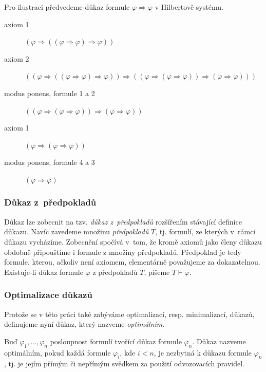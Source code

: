 \documentclass[thesis=B,czech,hidelinks]{thesis}[2012/06/26]
\begin{document}
\begin{exm}
\label{exm:proof_a>a}
Pro ilustraci předvedeme důkaz formule $\varphi \Rightarrow \varphi$ v Hilbertově systému.
\begin{description}
	\item[axiom 1] $(\varphi \Rightarrow ((\varphi \Rightarrow \varphi) \Rightarrow \varphi))$
	\item[axiom 2] $((\varphi \Rightarrow ((\varphi \Rightarrow \varphi) \Rightarrow \varphi)) \Rightarrow ((\varphi \Rightarrow (\varphi \Rightarrow \varphi)) \Rightarrow (\varphi \Rightarrow \varphi)))$
	\item[modus ponens, formule 1 a 2] $((\varphi \Rightarrow (\varphi \Rightarrow \varphi)) \Rightarrow (\varphi \Rightarrow \varphi))$
	\item[axiom 1] $(\varphi \Rightarrow (\varphi \Rightarrow \varphi))$
	\item[modus ponens, formule 4 a 3] $(\varphi \Rightarrow \varphi)$
\end{description}
\end{exm}

\subsubsection{Důkaz z~předpokladů}
\label{sec:proof_theory}

Důkaz lze zobecnit na tzv. \emph{důkaz z~předpokladů} rozšířením stávající definice důkazu. Navíc zavedeme množinu \emph{předpokladů} $T$, tj. formulí, ze kterých v~rámci důkazu vycházíme. Zobecnění spočívá v~tom, že kromě axiomů jako členy důkazu obdobně připouštíme i formule z množiny předpokladů. Předpoklad je tedy formule, kterou, ačkoliv není axiomem, elementárně považujeme za dokazatelnou. Existuje-li důkaz formule $\varphi$ z předpokladů $T$, píšeme $T \vdash \varphi$.

\subsubsection{Optimalizace důkazů}

Protože se v této práci také zabýváme optimalizací, resp. minimalizací, důkazů, definujeme nyní důkaz, který nazveme \emph{optimálním}.

\begin{dfn}
\label{dfn:optimal_proof}
Buď $\varphi_1, \ldots, \varphi_n$ posloupnost formulí tvořící důkaz formule $\varphi_n$. Důkaz nazveme optimálním, pokud každá formule $\varphi_i$, kde $i < n$, je nezbytná k důkazu formule $\varphi_n$, tj. je jejím přímým či nepřímým svědkem za použití odvozovacích pravidel.
\end{dfn}
\end{document}
